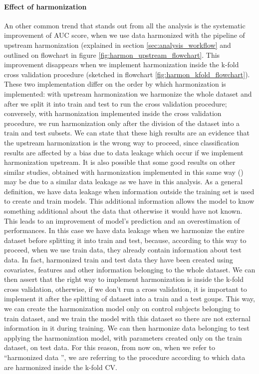\documentclass[11pt]{report}
\begin{document}
\paragraph{Effect of harmonization}
An other common trend that stands out from all the analysis is the systematic improvement of AUC score, when we use data harmonized with the pipeline of upstream harmonization (explained in section \ref{sec:analysis_workflow} and outlined on flowchart in figure \ref{fig:harmon_upstream_flowchart}.
This improvement disappears when we implement harmonization inside the k-fold cross validation procedure (sketched in flowchart \ref{fig:harmon_kfold_flowchart}).
These two implementation differ on the order by which harmonization is implemented: with upstream harmonization we harmonize the whole dataset and after we split it into train and test to run the cross validation procedure; conversely, with harmonization implemented inside the cross validation procedure, we run harmonization only after the division of the dataset into a train and test subsets.
We can state that these high results are an evidence that the upstream harmonization is the wrong way to proceed, since classification results are affected by a bias due to data leakage which occur if we implement harmonization upstream.
It is also possible that some good results on other similar studies, obtained with harmonization implemented in this same way (\cite{ingalhalikar-2021}) may be due to a similar data leakage as we have in this analysis.
As a general definition, we have data leakage when information outside the training set is used to create and train models. This additional information allows the model to know something additional about the data that otherwise it would have not known.
This leads to an improvement of model's prediction and an overestimation of performances.
In this case we have data leakage when we harmonize the entire dataset before splitting it into train and test, because, according to this way to proceed, when we use train data, they already contain information about test data.
In fact, harmonized train and test data they have been created using covariates, features and other information belonging to the whole dataset.
We can then assert that the right way to implement harmonization is inside the k-fold cross validation, otherwise, if we don't run a cross validation, it is important to implement it after the splitting of dataset into a train and a test goups. This way, we can create the harmonization model only on control subjects belonging to train dataset, and we train the model with this dataset so there are not external information in it during training.
We can then harmonize data belonging to test applying the harmonization model, with parameters created only on the train dataset, on test data.
For this reason, from now on, when we refer to \textquotedblleft harmonized data \textquotedblright, we are referring to the procedure according to which data are harmonized inside the k-fold CV.
\end{document}
